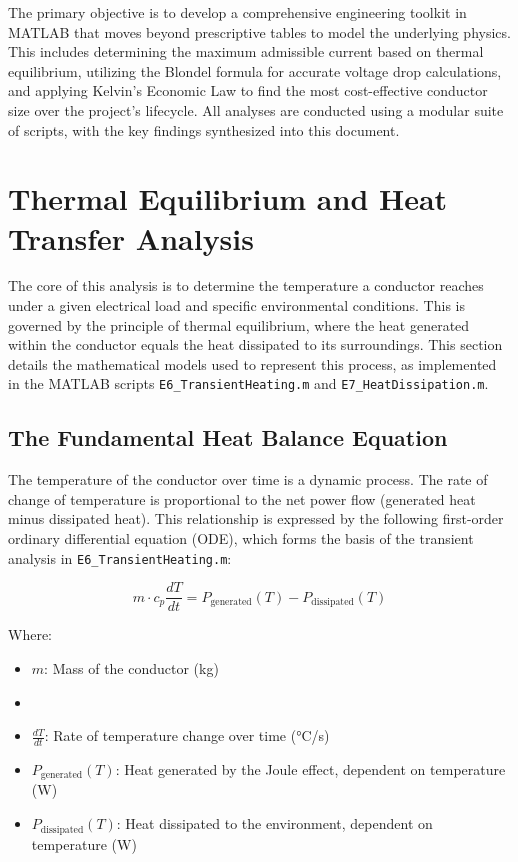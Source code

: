 \documentclass[12pt, a4paper]{article}
\begin{document}
The primary objective is to develop a comprehensive engineering toolkit in MATLAB that moves beyond prescriptive tables to model the underlying physics. This includes determining the maximum admissible current based on thermal equilibrium, utilizing the Blondel formula for accurate voltage drop calculations, and applying Kelvin's Economic Law to find the most cost-effective conductor size over the project's lifecycle. All analyses are conducted using a modular suite of scripts, with the key findings synthesized into this document.
\section{Thermal Equilibrium and Heat Transfer Analysis}

The core of this analysis is to determine the temperature a conductor reaches under a given electrical load and specific environmental conditions. This is governed by the principle of thermal equilibrium, where the heat generated within the conductor equals the heat dissipated to its surroundings. This section details the mathematical models used to represent this process, as implemented in the MATLAB scripts \texttt{E6\_TransientHeating.m} and \texttt{E7\_HeatDissipation.m}.

\subsection{The Fundamental Heat Balance Equation}

The temperature of the conductor over time is a dynamic process. The rate of change of temperature is proportional to the net power flow (generated heat minus dissipated heat). This relationship is expressed by the following first-order ordinary differential equation (ODE), which forms the basis of the transient analysis in \texttt{E6\_TransientHeating.m}:

\begin{equation}
m \cdot c_p \frac{dT}{dt} = P_{\text{generated}}(T) - P_{\text{dissipated}}(T)
\label{eq:ode}
\end{equation}

Where:
\begin{itemize}
    \item $m$: Mass of the conductor (kg)
    \item %
    \item $\frac{dT}{dt}$: Rate of temperature change over time (°C/s)
    \item $P_{\text{generated}}(T)$: Heat generated by the Joule effect, dependent on temperature (W)
    \item $P_{\text{dissipated}}(T)$: Heat dissipated to the environment, dependent on temperature (W)
\end{itemize}
\end{document}
